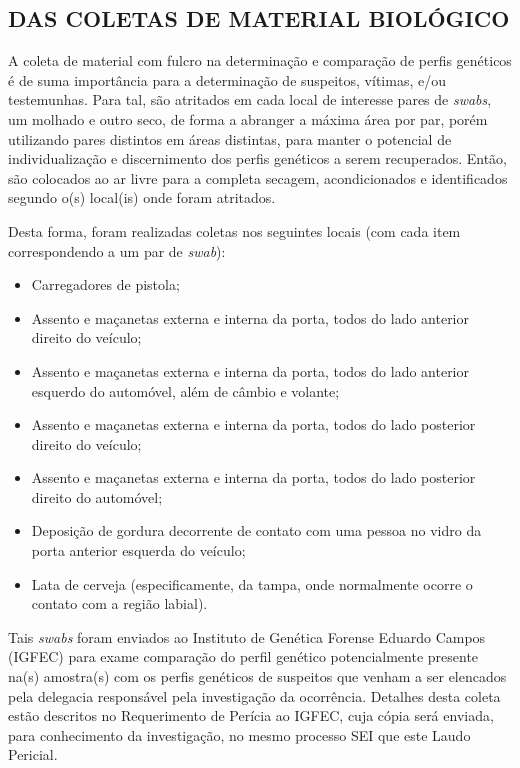 \documentclass[a4paper,12pt,oneside]{article}
\newcommand{\igfec}{Instituto de Genética Forense Eduardo Campos (IGFEC) para exame comparação do perfil genético potencialmente presente na(s) amostra(s) com os perfis genéticos de suspeitos que venham a ser elencados pela delegacia responsável pela investigação da ocorrência. Detalhes desta coleta estão descritos no Requerimento de Perícia ao IGFEC, cuja cópia será enviada, para conhecimento da investigação, no mesmo processo SEI que este Laudo Pericial}
\newcounter{c}
\newcounter{d}
\newcounter{u}
\begin{document}
\subsection{DAS COLETAS DE MATERIAL BIOLÓGICO \label{genetica}}

A coleta de material com fulcro na determinação e comparação de perfis genéticos é de suma importância para a determinação de suspeitos, vítimas, e/ou testemunhas. Para tal, são atritados em cada local de interesse pares de {\sl swabs}, um molhado e outro seco, de forma a abranger a máxima área por par, porém utilizando pares distintos em áreas distintas, para manter o potencial de individualização e discernimento dos perfis genéticos a serem recuperados. Então, são colocados ao ar livre para a completa secagem, acondicionados e identificados segundo o(s) local(is) onde foram atritados.

Desta forma, foram realizadas coletas nos seguintes locais (com cada item correspondendo a um par de {\sl swab}):

\begin{itemize}
	\item Carregadores de pistola;
	\item Assento e maçanetas externa e interna da porta, todos do lado anterior direito do veículo;
	\item Assento e maçanetas externa e interna da porta, todos do lado anterior esquerdo do automóvel, além de câmbio e volante;
	\item Assento e maçanetas externa e interna da porta, todos do lado posterior direito do veículo;
	\item Assento e maçanetas externa e interna da porta, todos do lado posterior direito do automóvel;
	\item Deposição de gordura decorrente de contato com uma pessoa no vidro da porta anterior esquerda do veículo;
	\item Lata de cerveja (especificamente, da tampa, onde normalmente ocorre o contato com a região labial).
\end{itemize}

Tais {\sl swabs} foram enviados ao \igfec.


\end{document}
